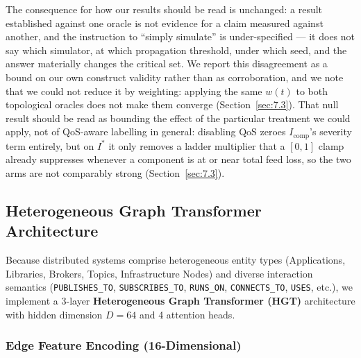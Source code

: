 The consequence for how our results should be read is unchanged: a result established against one
oracle is not evidence for a claim measured against another, and the instruction to ``simply
simulate'' is under-specified --- it does not say which simulator, at which propagation threshold,
under which seed, and the answer materially changes the critical set. We report this disagreement as
a bound on our own construct validity rather than as corroboration, and we note that we could not
reduce it by weighting: applying the same $w(t)$ to both topological oracles does not make them
converge (Section~\ref{sec:7.3}). That null result should be read as bounding the effect of the
particular treatment we could apply, not of QoS-aware labelling in general: disabling QoS zeroes
$I_{\text{comp}}$'s severity term entirely, but on $I^*$ it only removes a ladder multiplier that a
$[0,1]$ clamp already suppresses whenever a component is at or near total feed loss, so the two arms
are not comparably strong (Section~\ref{sec:7.3}).

\subsection{Heterogeneous Graph Transformer Architecture}
\label{sec:5.2}

Because distributed systems comprise heterogeneous entity types (Applications, Libraries, Brokers, Topics, Infrastructure Nodes) and diverse interaction semantics (\texttt{PUBLISHES\_TO}, \texttt{SUBSCRIBES\_TO}, \texttt{RUNS\_ON}, \texttt{CONNECTS\_TO}, \texttt{USES}, etc.), we implement a 3-layer \textbf{Heterogeneous Graph Transformer (HGT)} architecture \cite{hu2020hgt} with hidden dimension $D = 64$ and 4 attention heads.

\subsubsection{Edge Feature Encoding (16-Dimensional)}
\label{sec:5.2.1}

